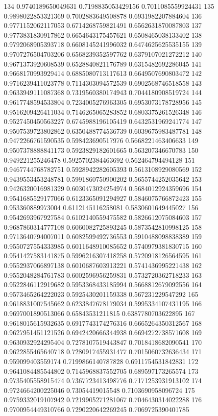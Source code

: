 134	0.9740189650049631	0.7198835053429156	0.7011085559924431
135	0.9898022853321369	0.7002883649508878	0.6931982207884604
136	0.9771152062117053	0.6714268759821491	0.6562631870087803
137	0.9773831830917862	0.6654643175457621	0.6508465038133402
138	0.9792068905393718	0.6608145241996032	0.6474625625535155
139	0.9707276504703206	0.6568239352597762	0.6379107021272212
140	0.9671373920608539	0.6528840821176789	0.6315482692286045
141	0.9668170993929414	0.6885080713117613	0.6649507690803472
142	0.9716239411023778	0.7114303094572539	0.6902568746518558
143	0.9633949111087368	0.7319560380174943	0.7044180908519724
144	0.9617748594533804	0.7234005276963305	0.6953073178728956
145	0.9516209426411034	0.7146265065283852	0.6803375261526348
146	0.9527450450563227	0.6745988196105419	0.6432531969241774
147	0.9507539723802862	0.6350488774536739	0.6039675983487781
148	0.9472266761590535	0.598423690517976	0.5668221463406633
149	0.9507378888841173	0.5923829182601665	0.563207346670783
150	0.949221255246478	0.5925702384463692	0.562464794494128
151	0.9467744768782751	0.5928942282605393	0.5613108929080569
152	0.9439553453248781	0.5991860750900202	0.5655744252035642
153	0.9426320016981329	0.6030473024254974	0.5684012924359696
154	0.9541685529177066	0.6123365091294927	0.5846075766872423
155	0.953360889973004	0.6112145116258081	0.5830601649445027
156	0.9542693967927584	0.6102140559475582	0.5826612075084603
157	0.9687860314777108	0.6060082725893245	0.5873542810998125
158	0.9713640794007011	0.6082599492736553	0.5910488098838389
159	0.9550727554333985	0.6011648910085652	0.5740979381830715
160	0.9541427583141875	0.5996216307418258	0.5720918126564595
161	0.9552937066897138	0.6010687603913221	0.5741436995221438
162	0.9552048284761783	0.6002596956259831	0.5732720362718233
163	0.9522846112919682	0.5953368433185994	0.5668812679092556
164	0.9573465264222023	0.5925430201159338	0.567231229547292
165	0.9618831007545662	0.6233847678179034	0.5995334107431195
166	0.9697001890513066	0.65843531211815	0.6387780703622895
167	0.9618015615932635	0.6917743174276316	0.6665264350312567
168	0.9627951451121526	0.6942420666344938	0.6694272738571608
169	0.9630932924295404	0.7278107519443847	0.7018418682090541
170	0.9622855465640718	0.7280917455931477	0.7015060732636434
171	0.959099403559174	0.7199866140787828	0.6911754531842831
172	0.9641084485544802	0.7145968837552705	0.689597173265574
173	0.9735405558915474	0.7367723413498776	0.7171253931913102
174	0.9724664200225046	0.73054419015548	0.7103690958096724
175	0.9759332019107942	0.7219905271281067	0.7046430314022288
176	0.9700954449310766	0.7290220642269245	0.7069725390401785
